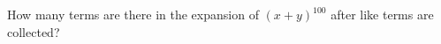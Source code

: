 \documentclass[../main.tex]{subfiles}
\begin{document}
How many terms are there in the expansion of $(x + y)^{100}$ after like terms are collected?

\solution
\end{document}
